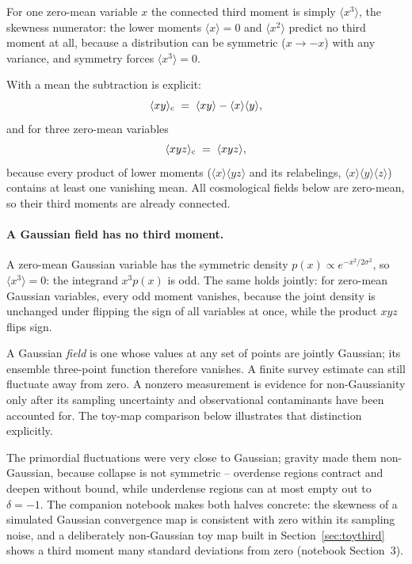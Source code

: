 \documentclass[11pt]{article}
\numberwithin{equation}{section}
\begin{document}
For one zero-mean variable $x$ the connected third moment is simply
$\langle x^3\rangle$, the skewness numerator: the lower moments
$\langle x\rangle = 0$ and $\langle x^2\rangle$ predict no third
moment at all, because a distribution can be symmetric
($x \to -x$) with any variance, and symmetry forces
$\langle x^3\rangle = 0$.

With a mean the subtraction is explicit:
\begin{equation}
  \langle x y \rangle_{\rm c}
  \;=\; \langle x y \rangle - \langle x\rangle\langle y \rangle ,
  \label{eq:connected2}
\end{equation}
and for three zero-mean variables
\begin{equation}
  \langle x y z \rangle_{\rm c} \;=\; \langle x y z \rangle ,
  \label{eq:connected3}
\end{equation}
because every product of lower moments
($\langle x\rangle\langle yz\rangle$ and its relabelings,
$\langle x\rangle\langle y\rangle\langle z\rangle$) contains at least
one vanishing mean.  All cosmological fields below are zero-mean, so
their third moments are already connected.

\paragraph{A Gaussian field has no third moment.}
A zero-mean Gaussian variable has the symmetric density
$p(x) \propto e^{-x^2/2\sigma^2}$, so $\langle x^3\rangle = 0$: the
integrand $x^3 p(x)$ is odd.  The same holds jointly: for zero-mean
Gaussian variables, every odd moment vanishes, because the joint
density is unchanged under flipping the sign of all variables at
once, while the product $xyz$ flips sign.

A Gaussian \emph{field} is one whose values at any set of points are
jointly Gaussian; its ensemble three-point function therefore vanishes.
A finite survey estimate can still fluctuate away from zero. A nonzero
measurement is evidence for non-Gaussianity only after its sampling
uncertainty and observational contaminants have been accounted for.
The toy-map comparison below illustrates that distinction explicitly.

The primordial fluctuations were very close to Gaussian; gravity made
them non-Gaussian, because collapse is not symmetric -- overdense
regions contract and deepen without bound, while underdense regions
can at most empty out to $\delta = -1$.  The companion notebook makes
both halves concrete: the skewness of a simulated Gaussian
convergence map is consistent with zero within its sampling noise,
and a deliberately non-Gaussian toy map built in
Section~\ref{sec:toythird} shows a third moment many standard
deviations from zero (notebook Section~3).
\end{document}
